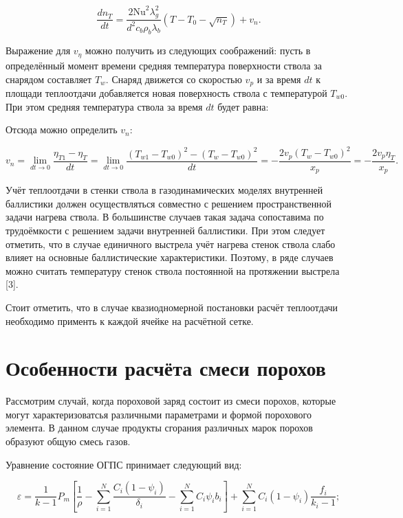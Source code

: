 \documentclass[14pt, a4paper]{extreport} %
\begin{document}
\begin{equation}
\frac{dn_T}{dt} = \frac{2 \mathrm{Nu}^2 \lambda_g^2}{d^2 c_b \rho_b \lambda_b} \left( T - T_0 - \sqrt{n_T} \right) + v_n.
\end{equation}

Выражение для \( v_\eta \) можно получить из следующих соображений: пусть в определённый момент времени средняя температура поверхности ствола за снарядом составляет \( T_w \). Снаряд движется со скоростью \( v_p \) и за время \( dt \) к площади теплоотдачи добавляется новая поверхность ствола с температурой \( T_{w0} \). При этом средняя температура ствола за время \( dt \) будет равна:

Отсюда можно определить \( v_n \):

\[
v_n = \lim_{dt \to 0} \frac{\eta_{T1} - \eta_T}{dt} = \lim_{dt \to 0} \frac{(T_{w1} - T_{w0})^2 - (T_w - T_{w0})^2}{dt} = -\frac{2v_p (T_w - T_{w0})^2}{x_p} = -\frac{2v_p \eta_T}{x_p}.
\]

Учёт теплоотдачи в стенки ствола в газодинамических моделях внутренней баллистики должен осуществляться совместно с решением пространственной задачи нагрева ствола. В большинстве случаев такая задача сопоставима по трудоёмкости с решением задачи внутренней
баллистики. При этом следует отметить, что в случае единичного выстрела учёт нагрева стенок ствола слабо влияет на основные баллистические характеристики. Поэтому, в ряде случаев можно считать температуру стенок ствола постоянной на протяжении выстрела [3].

Стоит отметить, что в случае квазиодномерной постановки расчёт теплоотдачи необходимо применть к каждой ячейке на расчётной сетке.

\section{Особенности расчёта смеси порохов}

Рассмотрим случай, когда пороховой заряд состоит из смеси порохов, которые могут характеризоватсья различными параметрами и формой порохового элемента. В данном случае продукты сгорания различных марок порохов образуют общую смесь газов.

Уравнение состояние ОГПС принимает следующий вид:

\begin{equation}
\varepsilon = \frac{1}{k-1} P_m \left[ \frac{1}{\rho} - \sum_{i=1}^N \frac{C_i (1 - \psi_i)}{\delta_i} - \sum_{i=1}^N C_i \psi_i b_i \right] + \sum_{i=1}^N C_i (1 - \psi_i) \frac{f_i}{k_i - 1}; 
\end{equation}
\end{document}
